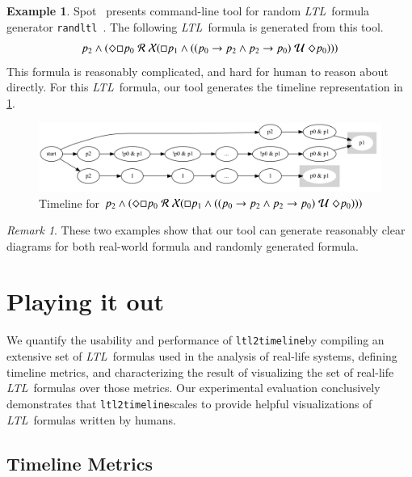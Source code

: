 \documentclass[preprint,12pt]{elsarticle}
\theoremstyle{definition}
\newtheorem{example}{Example}[section]
\theoremstyle{remark}
\newtheorem{remark}{Remark}[section]
\newcommand{\always}{\Box}
\newcommand{\eventually}{\Diamond}
\newcommand{\nextt}{\mathcal{X}}
\newcommand{\limplies}{\rightarrow}
\newcommand{\ltl}{\textit{LTL}}
\newcommand{\stronguntil}{\hspace{0.1cm} \mathcal{U}  \hspace{0.1cm}}
\newcommand{\weakrelease}{\hspace{0.1cm} \mathcal{R} \hspace{0.1cm}}
\newcommand{\tool}{\hspace{0.1cm}\texttt{ltl2timeline}\hspace{0.1cm}}
\begin{document}
\begin{example}
    Spot~\cite{SPOT-online} presents command-line tool for random \ltl\ formula generator \texttt{randltl}~\cite{duret.13.atva}. The following \ltl\ formula is generated from this tool.
    \[
    p_2 \land (\eventually \always p_0 \weakrelease \nextt(\always p_1 \land ((p_0 \limplies p_2 \land p_2 \limplies p_0) \stronguntil \eventually p_0)))
    \]
    This formula is reasonably complicated, and hard for human to reason about directly. For this \ltl\ formula, our tool generates the timeline representation in \cref{fig:ex13}.
    \begin{figure}[h!]
        \centering
        \includegraphics[scale=0.3]{examples/ex13/ex13.png}
        \caption{Timeline for $p_2 \land (\eventually \always p_0 \weakrelease \nextt(\always p_1 \land ((p_0 \limplies p_2 \land p_2 \limplies p_0) \stronguntil \eventually p_0)))$}
        \label{fig:ex13}
    \end{figure}
\end{example}
\begin{remark}
    These two examples show that our tool can generate reasonably clear diagrams for both real-world formula and randomly generated formula.
\end{remark}

\section{Playing it out} \label{sec:playing}%

We quantify the usability and performance of \tool by compiling an extensive set of \ltl\ formulas used in the analysis of real-life systems, defining timeline metrics, and characterizing the result of visualizing the set of real-life \ltl\ formulas over those metrics.
Our experimental evaluation conclusively demonstrates that \tool scales to provide helpful visualizations of \ltl\ formulas written by humans.


\subsection{Timeline Metrics}
\label{sec:metrics}
\end{document}
